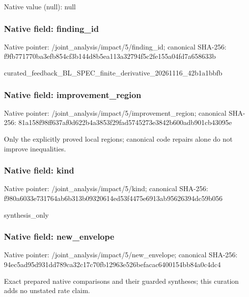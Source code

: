 \documentclass[10pt,a4paper]{article}
\begin{document}
Native value (null): null

\subsubsection{Native field: finding\_\allowbreak{}id}
Native pointer: /joint\_\allowbreak{}analysis/impact/5/finding\_\allowbreak{}id; canonical SHA-256: f9fb771770ba3efb854cf3b144d8b5ea113a32794f5c2fe155a04fd7a658633b

\begingroup\raggedright\sloppy curated\_\allowbreak{}feedback\_\allowbreak{}BL\_\allowbreak{}SPEC\_\allowbreak{}finite\_\allowbreak{}derivative\_\allowbreak{}20261116\_\allowbreak{}42b1a1bbfb\par\endgroup

\subsubsection{Native field: improvement\_\allowbreak{}region}
Native pointer: /joint\_\allowbreak{}analysis/impact/5/improvement\_\allowbreak{}region; canonical SHA-256: 81a158f98ff637af0d622b4a3853f29fad5745273e3842b600adb901cb43095e

\begingroup\raggedright\sloppy Only the explicitly proved local regions;\allowbreak{} canonical code repairs alone do not improve inequalities.\par\endgroup

\subsubsection{Native field: kind}
Native pointer: /joint\_\allowbreak{}analysis/impact/5/kind; canonical SHA-256: f980a6033e731764ab6b313b09320614ed53f4475e6913ab95626394dc59b056

\begingroup\raggedright\sloppy synthesis\_\allowbreak{}only\par\endgroup

\subsubsection{Native field: new\_\allowbreak{}envelope}
Native pointer: /joint\_\allowbreak{}analysis/impact/5/new\_\allowbreak{}envelope; canonical SHA-256: 94ec5ad95d931dd789ca32c17c70fb12963e526befacac6400154bb84a0c4dc4

\begingroup\raggedright\sloppy Exact prepared native comparisons and their guarded syntheses;\allowbreak{} this curation adds no unstated rate claim.\par\endgroup
\end{document}
